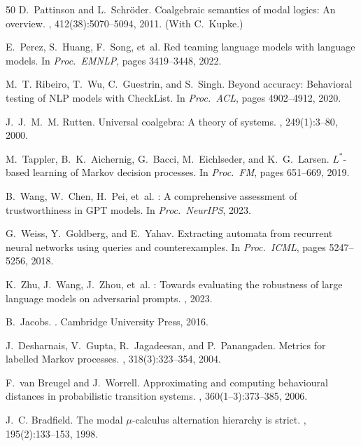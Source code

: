 \documentclass[11pt]{article}
\begin{document}
\begin{thebibliography}{50}
D.~Pattinson and L.~Schr{\"o}der.
\newblock Coalgebraic semantics of modal logics: An overview.
, 412(38):5070--5094, 2011.
\newblock (With C.~Kupke.)

E.~Perez, S.~Huang, F.~Song, et~al.
\newblock Red teaming language models with language models.
\newblock In {\em Proc.\ EMNLP}, pages 3419--3448, 2022.

M.~T. Ribeiro, T.~Wu, C.~Guestrin, and S.~Singh.
\newblock Beyond accuracy: Behavioral testing of {NLP} models with
  {CheckList}.
\newblock In {\em Proc.\ ACL}, pages 4902--4912, 2020.

J.~J.~M.~M. Rutten.
\newblock Universal coalgebra: A theory of systems.
, 249(1):3--80, 2000.


M.~Tappler, B.~K.~Aichernig, G.~Bacci, M.~Eichlseder, and
  K.~G.~Larsen.
\newblock $L^*$-based learning of {Markov} decision processes.
\newblock In {\em Proc.\ FM}, pages 651--669, 2019.

B.~Wang, W.~Chen, H.~Pei, et~al.
: A comprehensive assessment of
  trustworthiness in {GPT} models.
\newblock In {\em Proc.\ NeurIPS}, 2023.

G.~Weiss, Y.~Goldberg, and E.~Yahav.
\newblock Extracting automata from recurrent neural networks using
  queries and counterexamples.
\newblock In {\em Proc.\ ICML}, pages 5247--5256, 2018.

K.~Zhu, J.~Wang, J.~Zhou, et~al.
: Towards evaluating the robustness of large
  language models on adversarial prompts.
, 2023.


B.~Jacobs.
.
\newblock Cambridge University Press, 2016.

J.~Desharnais, V.~Gupta, R.~Jagadeesan, and P.~Panangaden.
\newblock Metrics for labelled {Markov} processes.
, 318(3):323--354, 2004.

F.~van Breugel and J.~Worrell.
\newblock Approximating and computing behavioural distances in
  probabilistic transition systems.
, 360(1--3):373--385, 2006.

J.~C. Bradfield.
\newblock The modal $\mu$-calculus alternation hierarchy is strict.
, 195(2):133--153, 1998.

\end{thebibliography}
\end{document}
